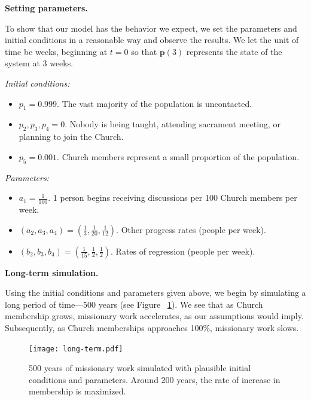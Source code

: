 \documentclass[11pt]{amsart}
\begin{document}
\vspace{1em}
\begin{center}
    \textbf{Setting parameters.}
\end{center}

\nopagebreak

To show that our model has the behavior we expect, we set the parameters and initial conditions in a reasonable way and observe the results. We let the unit of time be weeks, beginning at $t=0$ so that $\boldsymbol{p}(3)$ represents the state of the system at 3 weeks.

\textit{Initial conditions:}
\begin{itemize}
    \item $p_1 = 0.999$. The vast majority of the population is uncontacted.
    \item $p_2, p_3, p_4 = 0$. Nobody is being taught, attending sacrament meeting, or planning to join the Church.
    \item $p_5 = 0.001$. Church members represent a small proportion of the population.
\end{itemize}

\textit{Parameters:}
\begin{itemize}
    \item $a_1 = \frac{1}{100}$. 1 person begins receiving discussions per 100 Church members per week.
    \item $(a_2, a_3, a_4) = (\frac{1}{3}, \frac{1}{20}, \frac{1}{12})$. Other progress rates (people per week).
    \item $(b_2, b_3, b_4) = (\frac{1}{15}, \frac{1}{2}, \frac{1}{2})$. Rates of regression (people per week).
\end{itemize}

\vspace{1em}
\begin{center}
    \textbf{Long-term simulation.}
\end{center}

\nopagebreak

Using the initial conditions and parameters given above, we begin by simulating a long period of time---500 years (see Figure ~\ref{fig:LongTerm}). We see that as Church membership grows, missionary work accelerates, as our assumptions would imply. Subsequently, as Church memberships approaches 100\%, missionary work slows. 

\begin{figure}[htb]
\begin{center} %
\texttt{[image: long-term.pdf]}
\end{center}
\caption{500 years of missionary work simulated with plausible initial conditions and parameters. Around 200 years, the rate of increase in membership is maximized.}
\label{fig:LongTerm}
\end{figure}
\end{document}

